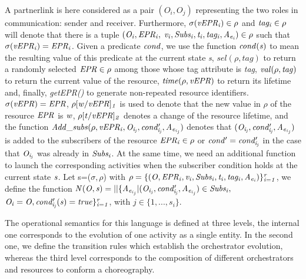 A partnerlink is here considered as a pair $(O_i,O_j)$ representing the two roles in communication: sender and receiver. Furthermore, $\it{\sigma(vEPR_i) \in \rho}$ and $\it{tag_i \in \rho}$ will denote that there is a tuple $\it{(O_i,EPR_i,}$ ${\it v_i,Subs_i,t_i,tag_i,A_{e{_i}}) \in \rho}$ such that $\it{\sigma(vEPR_i)=EPR_i}$. Given a predicate $\it{cond}$, we use the function $\it{cond(s)}$ to mean the resulting value of this predicate at the current state {\it s}, {\it $sel(\rho,tag)$} to return a randomly selected ${\it EPR \in \rho}$ among those whose tag attribute is {\em tag}, ${\it val(\rho,tag)}$ to return the current value of the resource, ${\it time(\rho,vEPR)}$ to return its lifetime and, finally, {\it getEPR()} to generate non-repeated resource identifiers. ${\it \sigma(vEPR)=EPR}$, ${\it \rho[w/vEPR]_1}$ is used to denote that the new value in $\rho$ of the resource $\it{EPR}$ is $\it{w}$, $\it{\rho[t/vEPR]_2}$ denotes a change of the resource lifetime, and the function $\it{Add\_subs(\rho,vEPR_i,O_{i_{j}},cond'_{i_{j}},A_{e{_i{_{_j}}}})}$ denotes that $\it{(O_{i_{j}},cond'_{i_{j}},A_{e{_i{_{_j}}}})}$ is added to the subscribers of the resource $\it{EPR_i \in \rho}$ or ${\it cond'=cond'_{i_{j}}}$ in the case that $\it{O_{i_{j}}}$ was already in ${\it Subs_i}$.
At the same time, we need an additional function to launch the corresponding activities %
when the subscriber condition holds at the current state ${\it s}$. Let s=($\sigma, \rho$) with $\it{ \rho=\{(O,EPR_i,v_i,Subs_i,t_i,tag_i,A_{e{_i}})\}_{i=1}^r}$, we define the function ${\it N(O,s)=||\{A_{e{_i{_{_j}}}}|(O_{i{_j}},cond'_{i_{j}},A_{e{_i{_{_j}}}}) \in Subs_i,}$
${\it O_{i}=O, cond'_{i_{j}}(s)=true\}_{i=1}^r}$, with $j \in \{1,...,s_i\}$.

The operational semantics for this language is defined at three levels, the internal one corresponds to the evolution of one activity as a single entity. In the second one, we define
the transition rules which establish the orchestrator evolution, whereas the third level corresponds to the composition
of different orchestrators and resources to conform a choreography.

